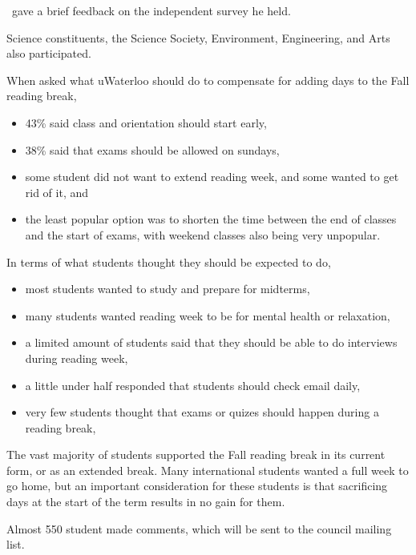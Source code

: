 \begin{information}
    \seneca\ gave a brief feedback on the independent survey he held. 

    Science constituents, the Science Society, Environment, Engineering, and 
    Arts also participated. 

    When asked what uWaterloo should do to compensate for adding days to the 
    Fall reading break, \begin{itemize} 
        \item 43\% said class and orientation should start early, 
        \item 38\% said that exams should be allowed on sundays, 
        \item some student did not want to extend reading week, and some wanted to
            get rid of it, and
        \item the least popular option was to shorten the time between the 
            end of classes and the start of exams, with weekend classes also 
            being very unpopular.
    \end{itemize} 

    In terms of what students thought they should be expected to do, 
    \begin{itemize}
        \item most students wanted to study and prepare for midterms,
        \item many students wanted reading week to be for mental health or
            relaxation, 
        \item a limited amount of students said that they should be able to do
            interviews during reading week,
        \item a little under half responded that students should check email 
            daily,
        \item very few students thought that exams or quizes should happen 
            during a reading break,
    \end{itemize}

    The vast majority of students supported the Fall reading break in its 
    current form, or as an extended break.  Many international students wanted
    a full week to go home, but an important consideration for these students
    is that sacrificing days at the start of the term results in no gain for 
    them. 

    Almost 550 student made comments, which will be sent to the council 
    mailing list. 


\end{information}
